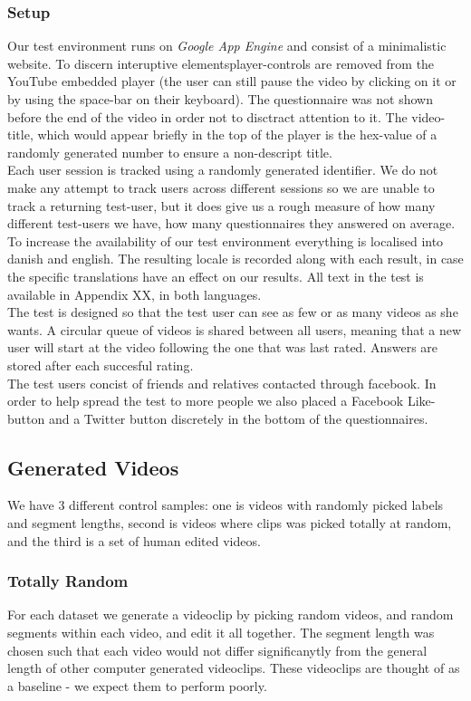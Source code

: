 \subsubsection{Setup}
%
Our test environment runs on \textit{Google App Engine} and consist of a minimalistic website. To discern interuptive elementsplayer-controls are removed from the YouTube embedded player (the user can still pause the video by clicking on it or by using the space-bar on their keyboard). The questionnaire was not shown before the end of the video in order not to disctract attention to it. The video-title, which would appear briefly in the top of the player is the hex-value of a randomly generated number to ensure a non-descript title.\\
Each user session is tracked using a randomly generated identifier. We do not make any attempt to track users across different sessions so we are unable to track a returning test-user, but it does give us a rough measure of how many different test-users we have, how many questionnaires they answered on average.\\
To increase the availability of our test environment everything is localised into danish and english. The resulting locale is recorded along with each result, in case the specific translations have an effect on our results. All text in the test is available in Appendix XX, in both languages.\\
The test is designed so that the test user can see as few or as many videos as she wants. A circular queue of videos is shared between all users, meaning that a new user will start at the video following the one that was last rated. Answers are stored after each succesful rating.\\
The test users concist of friends and relatives contacted through facebook. In order to help spread the test to more people we also placed a Facebook Like-button and a Twitter button discretely in the bottom of the questionnaires.\\
%
\subsection{Generated Videos}
%
We have 3 different control samples: one is videos with randomly picked labels and segment lengths, second is videos where clips was picked totally at random, and the third is a set of human edited videos.
%
\subsubsection{Totally Random}
%
For each dataset we generate a videoclip by picking random videos, and random segments within each video, and edit it all together. The segment length was chosen such that each video would not differ significanytly from the general length of other computer generated videoclips. These videoclips are thought of as a baseline - we expect them to perform poorly.
%
